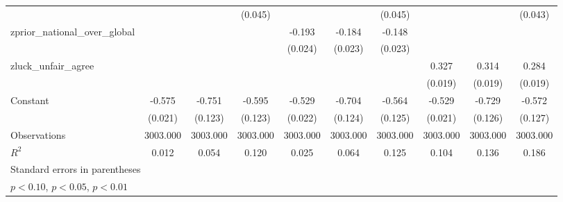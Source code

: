 {\begin{tabular}{l*{9}{c}}
                    &                     &                     &     (0.045)         &                     &                     &     (0.045)         &                     &                     &     (0.043)         \\
\addlinespace
zprior\_national\_over\_global&                     &                     &                     &      -0.193\sym{***}&      -0.184\sym{***}&      -0.148\sym{***}&                     &                     &                     \\
                    &                     &                     &                     &     (0.024)         &     (0.023)         &     (0.023)         &                     &                     &                     \\
\addlinespace
zluck\_unfair\_agree  &                     &                     &                     &                     &                     &                     &       0.327\sym{***}&       0.314\sym{***}&       0.284\sym{***}\\
                    &                     &                     &                     &                     &                     &                     &     (0.019)         &     (0.019)         &     (0.019)         \\
\addlinespace
Constant            &      -0.575\sym{***}&      -0.751\sym{***}&      -0.595\sym{***}&      -0.529\sym{***}&      -0.704\sym{***}&      -0.564\sym{***}&      -0.529\sym{***}&      -0.729\sym{***}&      -0.572\sym{***}\\
                    &     (0.021)         &     (0.123)         &     (0.123)         &     (0.022)         &     (0.124)         &     (0.125)         &     (0.021)         &     (0.126)         &     (0.127)         \\
\midrule
Observations        &    3003.000         &    3003.000         &    3003.000         &    3003.000         &    3003.000         &    3003.000         &    3003.000         &    3003.000         &    3003.000         \\
\(R^{2}\)           &       0.012         &       0.054         &       0.120         &       0.025         &       0.064         &       0.125         &       0.104         &       0.136         &       0.186         \\
\bottomrule
\multicolumn{10}{l}{\footnotesize Standard errors in parentheses}\\
\multicolumn{10}{l}{\footnotesize \sym{*} \(p<0.10\), \sym{**} \(p<0.05\), \sym{***} \(p<0.01\)}\\
\end{tabular}
}

